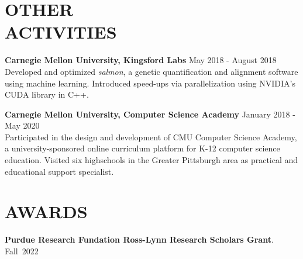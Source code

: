 \documentclass[margin, 10pt]{res-short} %
\begin{document}
\begin{resume}
\section{OTHER \\ ACTIVITIES}

{\bf Carnegie Mellon University, Kingsford Labs} \hfill May 2018 - August 2018\\
Developed and optimized \emph{salmon}, a genetic quantification and alignment software using machine learning. Introduced speed-ups via parallelization using NVIDIA's CUDA library in C++.

{\bf Carnegie Mellon University, Computer Science Academy} \hfill January 2018 - May 2020\\
Participated in the design and development of CMU Computer Science Academy, a university-sponsored online curriculum platform for K-12 computer science education. Visited six highschools in the Greater Pittsburgh area as practical and educational support specialist.

\section{AWARDS}
{\bf Purdue Research Fundation Ross-Lynn Research Scholars Grant}. \hfill Fall~2022


\end{resume}
\end{document}

